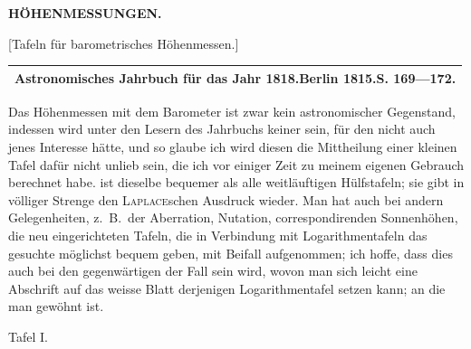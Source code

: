 \par\clearpage
\noindent{}\hfill{\small\textbf{HÖHENMESSUNGEN.}}\hfill\null\par\medskip
\vspace*{.23\textheight}
\begin{center}
[Tafeln für barometrisches Höhenmessen.]
\par\bigskip
{\footnotesize
\begin{tabular}{c}
\hline
Astronomisches Jahrbuch für das Jahr 1818.\quad Berlin 1815.\quad S. 169---172.\\
\hline
\end{tabular}}
\end{center}
\par\noindent\hspace*{\parindent}Das Höhenmessen mit dem Barometer ist zwar kein astronomischer Gegenstand,
indessen wird unter den Lesern des Jahrbuchs keiner sein, für den nicht auch jenes Interesse hätte,
und so glaube ich wird diesen die Mittheilung einer kleinen Tafel dafür nicht unlieb sein,
die ich vor einiger Zeit zu meinem eigenen Gebrauch berechnet habe.  ist dieselbe
bequemer als alle weitläuftigen Hülfstafeln; sie gibt in völliger Strenge den
\textsc{Laplace}schen Ausdruck wieder. Man hat auch bei andern Gelegenheiten, z.\ B.\ der Aberration,
Nutation, correspondirenden Sonnenhöhen, die neu eingerichteten Tafeln, die in Verbindung mit
Logarithmentafeln das gesuchte möglichst bequem geben, mit Beifall aufgenommen; ich hoffe,
dass dies auch bei den gegenwärtigen der Fall sein wird, wovon man sich leicht eine Abschrift auf
das weisse Blatt derjenigen Logarithmentafel setzen kann; an die man gewöhnt ist.
\begin{center}Tafel I.\end{center}

